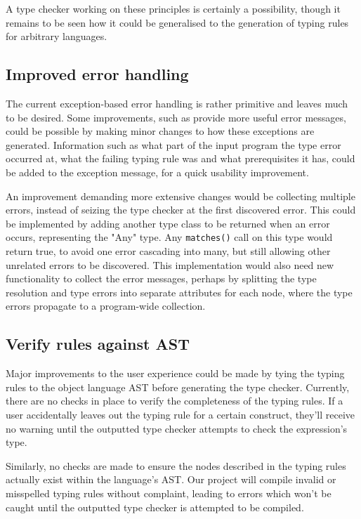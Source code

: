 \documentclass[nofilelist]{cslthse-msc}
\begin{document}

A type checker working on these principles is certainly a possibility, though it remains to be seen how it could be generalised to the generation of typing rules for arbitrary languages.

\subsection{Improved error handling}
The current exception-based error handling is rather primitive and leaves much to be desired.
Some improvements, such as provide more useful error messages, could be possible by making minor changes to how these exceptions are generated.
Information such as what part of the input program the type error occurred at, what the failing typing rule was and what prerequisites it has, could be added to the exception message, for a quick usability improvement.

An improvement demanding more extensive changes would be collecting multiple errors, instead of seizing the type checker at the first discovered error.
This could be implemented by adding another type class to be returned when an error occurs, representing the "Any" type.
Any \verb|matches()| call on this type would return true, to avoid one error cascading into many, but still allowing other unrelated errors to be discovered.
This implementation would also need new functionality to collect the error messages, perhaps by splitting the type resolution and type errors into separate attributes for each node, where the type errors propagate to a program-wide collection.


\subsection{Verify rules against AST}
Major improvements to the user experience could be made by tying the typing rules to the object language AST before generating the type checker.
Currently, there are no checks in place to verify the completeness of the typing rules.
If a user accidentally leaves out the typing rule for a certain construct, they'll receive no warning until the outputted type checker attempts to check the expression's type.

Similarly, no checks are made to ensure the nodes described in the typing rules actually exist within the language's AST.
Our project will compile invalid or misspelled typing rules without complaint, leading to errors which won't be caught until the outputted type checker is attempted to be compiled.
\end{document}
